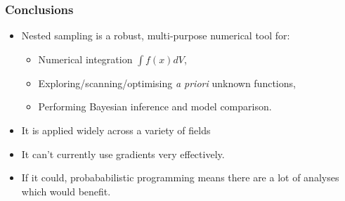 \documentclass[aspectratio=169]{beamer}
\begin{document}
%
%
%    


\begin{frame}
    \frametitle{Conclusions}
    \begin{itemize}
        \item Nested sampling is a robust, multi-purpose numerical tool for:
            \begin{itemize}
                \item Numerical integration $\int f(x) dV$,
                \item Exploring/scanning/optimising \textit{a priori} unknown functions,
                \item Performing Bayesian inference and model comparison.
            \end{itemize}
        \item It is applied widely across a variety of fields
        \item It can't currently use gradients very effectively.
        \item If it could, probababilistic programming means there are a lot of analyses which would benefit.
    \end{itemize}
\end{frame}
\end{document}
